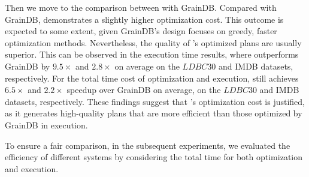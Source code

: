 {Then we move to the comparison between \name with GrainDB. Compared with GrainDB, \name demonstrates a slightly higher optimization cost. This outcome is expected to some extent, given GrainDB's design focuses on greedy, faster optimization methods.
Nevertheless, the quality of \name's optimized plans are usually superior. This can be observed in the execution time results, where \name outperforms GrainDB by $9.5\times$ and $2.8\times$ on average on the $LDBC30$ and IMDB datasets, respectively.
For the total time cost of optimization and execution, \name still achieves $6.5\times$ and $2.2\times$ speedup over GrainDB on average, on the $LDBC30$ and IMDB datasets, respectively.
These findings suggest that \name's optimization cost is justified, as it generates high-quality plans that are more efficient than those optimized by GrainDB in execution.

To ensure a fair comparison, in the subsequent experiments, we evaluated the efficiency of different systems by considering the total time for both optimization and execution.
}


